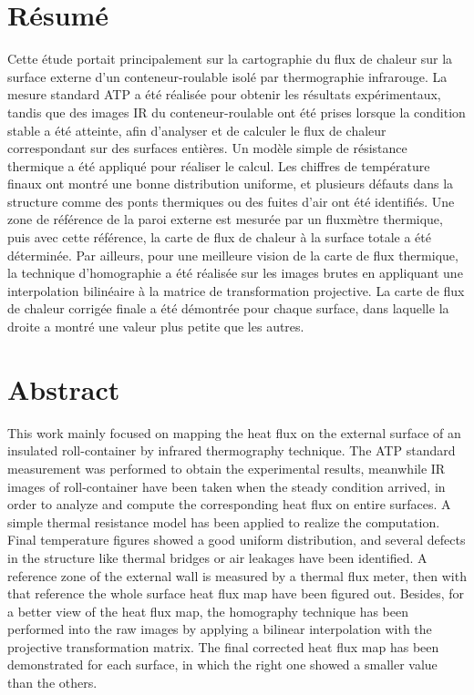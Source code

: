 \section*{Résumé}
Cette étude portait principalement sur la cartographie du flux de chaleur sur la surface externe d'un conteneur-roulable isolé par thermographie infrarouge.
La mesure standard ATP a été réalisée pour obtenir les résultats expérimentaux, tandis que des images IR du conteneur-roulable ont été prises lorsque la condition stable a été atteinte, afin d'analyser et de calculer le flux de chaleur correspondant sur des surfaces entières. Un modèle simple de résistance thermique a été appliqué pour réaliser le calcul. Les chiffres de température finaux ont montré une bonne distribution uniforme, et plusieurs défauts dans la structure comme des ponts thermiques ou des fuites d'air ont été identifiés. Une zone de référence de la paroi externe est mesurée par un fluxmètre thermique, puis avec cette référence, la carte de flux de chaleur à la surface totale a été déterminée. Par ailleurs, pour une meilleure vision de la carte de flux thermique, la technique d'homographie a été réalisée sur les images brutes en appliquant une interpolation bilinéaire à la matrice de transformation projective. La carte de flux de chaleur corrigée finale a été démontrée pour chaque surface, dans laquelle la droite a montré une valeur plus petite que les autres.

\section*{Abstract}
This work mainly focused on mapping the heat flux on the external surface of an insulated roll-container by infrared thermography technique. The ATP standard measurement was performed to obtain the experimental results, meanwhile IR images of roll-container have been taken when the steady condition arrived, in order to analyze and compute the corresponding heat flux on entire surfaces. A simple thermal resistance model has been applied to realize the computation. Final temperature figures showed a good uniform distribution, and several defects in the structure like thermal bridges or air leakages have been identified. A reference zone of the external wall is measured by a thermal flux meter, then with that reference the whole surface heat flux map have been figured out. Besides, for a better view of the heat flux map, the homography technique has been performed into the raw images by applying a bilinear interpolation with the projective transformation matrix. The final corrected heat flux map has been demonstrated for each surface, in which the right one showed a smaller value than the others.


